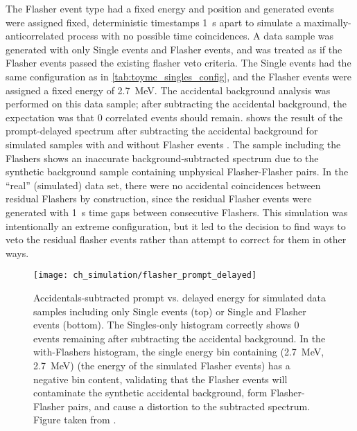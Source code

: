 The Flasher event type had a fixed energy and position
and generated events were assigned fixed, deterministic timestamps \SI{1}{\s} apart
to simulate a maximally-anticorrelated process with no possible time coincidences.
A data sample was generated with only Single events and Flasher events,
and was treated as if the Flasher events passed the existing flasher veto criteria.
The Single events had the same configuration as in \cref{tab:toymc_singles_config},
and the Flasher events were assigned a fixed energy of \SI{2.7}{\MeV}.
The accidental background analysis was performed on this data sample;
after subtracting the accidental background,
the expectation was that 0 correlated events should remain.
 shows the result of the prompt-delayed spectrum
after subtracting the accidental background
for simulated samples with and without Flasher events \cite{flasher_sim}.
The sample including the Flashers shows
an inaccurate background-subtracted spectrum
due to the synthetic background sample containing unphysical Flasher-Flasher pairs.
In the ``real'' (simulated) data set,
there were no accidental coincidences between residual Flashers by construction,
since the residual Flasher events were generated with \SI{1}{\s} time gaps
between consecutive Flashers.
This simulation was intentionally an extreme configuration,
but it led to the decision to find ways to veto the residual flasher events
rather than attempt to correct for them in other ways.

\begin{figure}
    \centering
    \texttt{[image: ch\_simulation/flasher\_prompt\_delayed]}
    \caption[Simulated residual flashers impact]{
        Accidentals-subtracted prompt vs. delayed energy for simulated data samples
        including only Single events (top) or Single and Flasher events (bottom).
        The Singles-only histogram correctly shows 0 events remaining
        after subtracting the accidental background.
        In the with-Flashers histogram,
        the single energy bin containing (\SI{2.7}{\MeV}, \SI{2.7}{\MeV})
        (the energy of the simulated Flasher events)
        has a negative bin content,
        validating that the Flasher events
        will contaminate the synthetic accidental background,
        form Flasher-Flasher pairs, and cause a distortion to the subtracted spectrum.
        Figure taken from \cite{flasher_sim}.
    }
    \label{fig:sim_flasher_prompt_delayed}
\end{figure}



